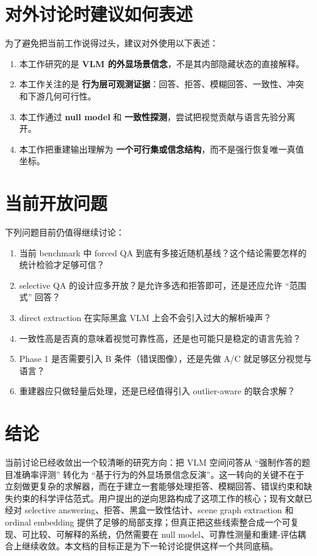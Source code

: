 \documentclass[11pt,a4paper]{ctexart}
\begin{document}
\section{对外讨论时建议如何表述}

为了避免把当前工作说得过头，建议对外使用以下表述：

\begin{enumerate}[label=\arabic*.]
  \item 本工作研究的是 \textbf{VLM 的外显场景信念}，不是其内部隐藏状态的直接解释。
  \item 本工作关注的是 \textbf{行为层可观测证据}：回答、拒答、模糊回答、一致性、冲突和下游几何可行性。
  \item 本工作通过 \textbf{null model} 和 \textbf{一致性探测}，尝试把视觉贡献与语言先验分离开。
  \item 本工作把重建输出理解为 \textbf{一个可行集或信念结构}，而不是强行恢复唯一真值坐标。
\end{enumerate}

\section{当前开放问题}

下列问题目前仍值得继续讨论：

\begin{enumerate}[label=\arabic*.]
  \item 当前 benchmark 中 forced QA 到底有多接近随机基线？这个结论需要怎样的统计检验才足够可信？
  \item selective QA 的设计应多开放？是允许多选和拒答即可，还是还应允许 ``范围式'' 回答？
  \item direct extraction 在实际黑盒 VLM 上会不会引入过大的解析噪声？
  \item 一致性高是否真的意味着视觉可靠性高，还是也可能只是稳定的语言先验？
  \item Phase 1 是否需要引入 B 条件（错误图像），还是先做 A/C 就足够区分视觉与语言？
  \item 重建器应只做轻量后处理，还是已经值得引入 outlier-aware 的联合求解？
\end{enumerate}

\section{结论}

当前讨论已经收敛出一个较清晰的研究方向：把 VLM 空间问答从 ``强制作答的题目准确率评测'' 转化为 ``基于行为的外显场景信念反演''。这一转向的关键不在于立刻做更复杂的求解器，而在于建立一套能够处理拒答、模糊回答、错误约束和缺失约束的科学评估范式。用户提出的逆向思路构成了这项工作的核心；现有文献已经对 selective answering、拒答、黑盒一致性估计、scene graph extraction 和 ordinal embedding 提供了足够的局部支撑；但真正把这些线索整合成一个可复现、可比较、可解释的系统，仍然需要在 null model、可靠性测量和重建-评估耦合上继续收敛。本文档的目标正是为下一轮讨论提供这样一个共同底稿。
\end{document}
